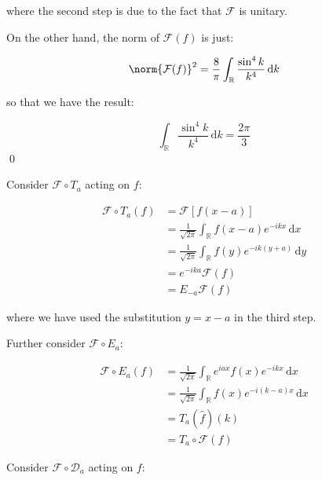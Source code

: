 \documentclass[12pt]{article}
\begin{document}
where the second step is due to the fact that $\mathcal{F}$ is unitary.

On the other hand, the norm of $\mathcal{F}(f)$ is just:

\begin{equation}
    \norm{\mathcal{F}(f)}^{2} = \frac{8}{\pi} \int_{\mathbb{R}} \frac{\sin^{4}{k}}{k^{4}} \, \mathrm{d}k
\end{equation}

so that we have the result:

\begin{equation}
    \int_{\mathbb{R}} \frac{\sin^{4}{k}}{k^{4}} \, \mathrm{d}k = \frac{2\pi}{3}
\end{equation}
\qed



Consider $\mathcal{F} \circ T_{a}$ acting on $f$:

\begin{equation}
\begin{split}
    \mathcal{F} \circ T_{a}(f) &= \mathcal{F} [f(x - a)] \\
    &= \frac{1}{\sqrt{2\pi}} \int_{\mathbb{R}} f(x - a) e^{-ikx} \, \mathrm{d}x \\
    &= \frac{1}{\sqrt{2\pi}} \int_{\mathbb{R}} f(y) e^{-ik(y + a)} \, \mathrm{d}y \\
    &= e^{-ika} \mathcal{F}(f) \\
    &= E_{-a} \mathcal{F}(f)
\end{split}
\end{equation}

where we have used the substitution $y = x - a$ in the third step.

Further consider $\mathcal{F} \circ E_{a}$:

\begin{equation}
\begin{split}
    \mathcal{F} \circ E_{a}(f) &= \frac{1}{\sqrt{2\pi}} \int_{\mathbb{R}} e^{iax} f(x) e^{-ikx} \, \mathrm{d}x \\
    &= \frac{1}{\sqrt{2\pi}} \int_{\mathbb{R}} f(x) e^{-i(k - a)x} \, \mathrm{d}x \\
    &= T_{a}(\hat{f})(k) \\
    &= T_{a} \circ \mathcal{F}(f)
\end{split}
\end{equation}

Consider $\mathcal{F} \circ \mathcal{D}_{a}$ acting on $f$:
\end{document}

